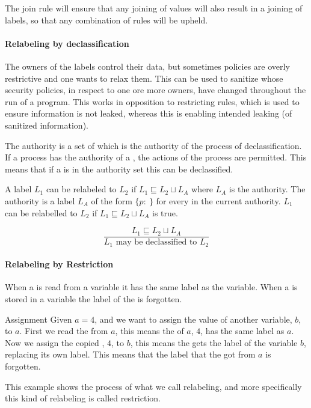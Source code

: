 The join rule will ensure that any joining of values will also result in a joining of labels, so that any combination of rules will be upheld.

\paragraph{Relabeling by declassification}
The owners of the labels control their data, but sometimes policies are overly restrictive and one wants to relax them.
This can be used to sanitize \xvalues{} whose security policies, in respect to one ore more owners, have changed throughout the run of a program.
This works in opposition to restricting rules, which is used to ensure information is not leaked, whereas this is enabling intended leaking (of sanitized information).

The authority is a set of \principals{} which is the authority of the process of declassification.
If a process has the authority of a \principal{}, the actions of the process are permitted.
This means that if a \principal{} is in the authority set this can be declassified.

\begin{definition}
  A label $L_1$ can be relabeled to $L_2$ if $L_1 \sqsubseteq L_2 \sqcup L_A$ where $L_A$ is the authority.
  The authority is a label $L_A$ of the form $\{p: \ \}$ for every \principal{} in the current authority.
  $L_1$ can be relabelled to $L_2$ if $L_1 \sqsubseteq L_2 \sqcup L_A$ is true.
  \begin{center}
    \[\frac{L_1 \sqsubseteq L_2 \sqcup L_A}{L_1 \text{ may be declassified to } L_2}\]    
  \end{center}
\end{definition}

\paragraph{Relabeling by Restriction}
When a \xvalue{} is read from a variable it has the same label as the variable.
When a \xvalue{} is stored in a variable the label of the \xvalue{} is forgotten.
\begin{example}{Assignment}
  Given $a = 4$, and we want to assign the value of another variable, $b$, to $a$.
  First we read the \xvalue{} from $a$, this means the \xvalue{} of $a$, $4$, has the same label as $a$.
  Now we assign the copied \xvalue{}, $4$, to $b$, this means the \xvalue{} gets the label of the variable $b$, replacing its own label.
  This means that the label that the \xvalue{} got from $a$ is forgotten.
\end{example}
This example shows the process of what we call relabeling, and more specifically this kind of relabeling is called restriction.

